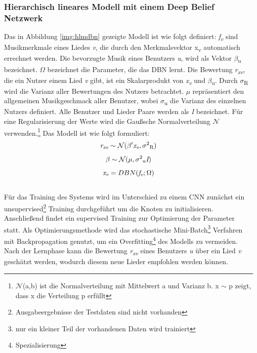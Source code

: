\documentclass[twosided,a4,10pt]{article}
\begin{document}
\begin{multicols}{2}
		\subsubsection{Hierarchisch lineares Modell mit einem Deep Belief Netzwerk}
		Das in Abbildung \ref{img:hlmdbn} gezeigte Modell ist wie folgt definiert: \textit{f\textsubscript{v}} sind Musikmerkmale eines Liedes \textit{v}, die durch den Merkmalsvektor x\textsubscript{v} automatisch errechnet werden. Die bevorzugte Musik eines Benutzers \textit{u}, wird als Vektor $\beta$\textsubscript{u} bezeichnet. $\Omega$ bezeichnet die Parameter, die das DBN lernt. Die Bewertung \textit{r\textsubscript{xv}}, die ein Nutzer einem Lied \textit{v} gibt, ist ein Skalarprodukt von \textit{x\textsubscript{v}} und $\beta$\textsubscript{u}. Durch $\sigma$\textsubscript{R} wird die Varianz aller Bewertungen des Nutzers betrachtet. $\mu$ repräsentiert den allgemeinen Musikgeschmack aller Benutzer, wobei $\sigma$\textsubscript{u} die Varianz des einzelnen Nutzers definiert. Alle Benutzer und Lieder Paare werden als \textit{I} bezeichnet. Für eine Regularisierung der Werte wird die Gaußsche Normalverteilung $\mathcal{N}$ verwenden.\footnote[15]{$\mathcal{N}$(a,b) ist die Normalverteilung mit Mittelwert a und Varianz b. x $\sim$ p zeigt, dass x die Verteilung p erfüllt}\newline
		Das Modell ist wie folgt formuliert:\newline
		\begin{equation*}
		\centering
		\textit{r\textsubscript{xv}}\sim\mathcal{N}(\beta'\textit{x\textsubscript{v}},\sigma\textsuperscript{2}\textsubscript{R})
		\end{equation*}
		\begin{equation*}
		\centering
		\beta\sim\mathcal{N}(\mu,\sigma\textsuperscript{2}\textsubscript{u}\textit{I})
		\end{equation*}
		\begin{equation*}
		\textit{x\textsubscript{v}} = DBN(\textit{f\textsubscript{v}};\Omega)
		\end{equation*}\newline\\
		Für das Training des Systems wird im Unterschied zu einem CNN zunächst ein unsupervised\footnote[16]{Ausgabeergebnisse der Testdaten sind nicht vorhanden} Training durchgeführt um die Knoten zu initialisieren. Anschließend findet ein supervised Training zur Optimierung der Parameter statt. Als Optimierungsmethode wird das stochastische Mini-Batch\footnote[17]{nur ein kleiner Teil der vorhandenen Daten wird trainiert} Verfahren mit Backpropagation genutzt, um ein Overfitting\footnote[18]{Spezialisierung} des Modells zu vermeiden. Nach der Lernphase kann die Bewertung \textit{r\textsubscript{xv}} eines Benutzers \textit{u} über ein Lied \textit{v} geschätzt werden, wodurch diesem neue Lieder empfohlen werden können. \cite{wang}

\end{multicols}
\end{document}
